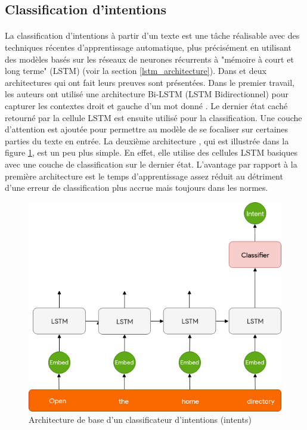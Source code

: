 \subsection{Classification d'intentions}
\paragraph{}
La classification d'intentions à partir d'un texte est une tâche réalisable avec des techniques récentes d'apprentissage automatique, plus précisément en utilisant des modèles basés sur les réseaux de neurones récurrents à "mémoire à court et long terme" (LSTM) (voir la section \ref{lstm_architecture}). Dans \citep{intent_classification} et \citep{intent_slots} deux architectures qui ont fait leurs preuves sont présentées. Dans le premier travail, les auteurs ont utilisé une architecture Bi-LSTM (LSTM Bidirectionnel) pour capturer les contextes droit et gauche d'un mot donné \citep{blstm}. Le dernier état caché retourné par la cellule LSTM est ensuite utilisé pour la classification. Une couche d'attention est ajoutée \citep{attention_mechanism} pour permettre au modèle de se focaliser sur certaines parties du texte en entrée. La deuxième architecture , qui est illustrée dans la figure \ref{LSTM_intent}, est un peu plus simple. En effet, elle utilise des cellules LSTM basiques avec une couche de classification sur le dernier état. L'avantage par rapport à la première architecture est le temps d'apprentissage assez réduit au détriment d'une erreur de classification plus accrue mais toujours dans les normes.
\begin{figure}[H]
	\centering
	\includegraphics[width=0.65\linewidth]{images/NLU/intent_classification.png}
	\caption{Architecture de base d'un classificateur d'intentions (intents) 
	\citep{intent_classification}}
	\label{LSTM_intent}
\end{figure}
